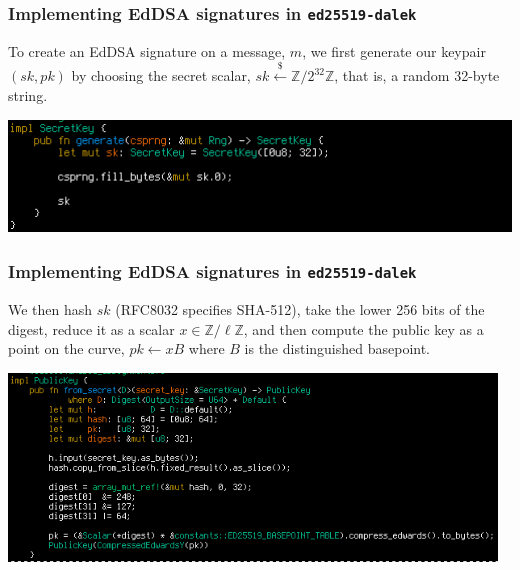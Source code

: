 \documentclass[xetex,aspectratio=169]{beamer}
\newcommand{\ZZ}{\mathbb{Z}}
\newcommand{\uniformsample}{\xleftarrow\$}
\begin{document}
  
  \begin{frame}
    \frametitle{Implementing EdDSA signatures in \texttt{ed25519-dalek}}

    To create an EdDSA signature on a message, $m$, we first generate
    our keypair $(sk, pk)$ by choosing the secret scalar,
    $sk \uniformsample \ZZ / 2^{32}\ZZ$, that is, a random 32-byte
    string. \pause

    \begin{center}
      \includegraphics[height=3cm]{keygen-secret.png}
    \end{center}
  \end{frame}

  \begin{frame}
    \frametitle{Implementing EdDSA signatures in \texttt{ed25519-dalek}}

    We then hash $sk$ (RFC8032 specifies SHA-512), take the lower 256
    bits of the digest, reduce it as a scalar $x \in \ZZ / \ell\ZZ$,
    and then compute the public key as a point on the curve,
    $pk \gets x B$ where $B$ is the distinguished basepoint. \pause

    \begin{center}
      \includegraphics[height=5cm]{keygen-public.png}
    \end{center}
  \end{frame}
\end{document}
